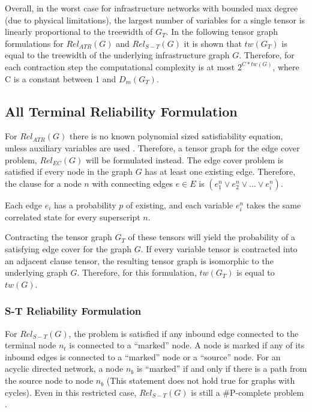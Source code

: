 \documentclass[12pt,twocolumn]{article}
\begin{document}
Overall, in the worst case for infrastructure networks with bounded max degree (due to physical limitations), the largest number of variables for a single tensor is linearly proportional to the treewidth of \(G_T\). In the following tensor graph formulations for \(Rel_{ATR}(G)\) and \(Rel_{S-T}(G)\) it is shown that \(tw(G_T)\) is equal to the treewidth of the underlying infrastructure graph \(G\). Therefore, for each contraction step the computational complexity is at most \(2^{C*tw(G)}\), where C is a constant between 1 and \(D_m(G_T)\).

\hypertarget{all-terminal-reliability-formulation}{%
\subsection{All Terminal Reliability Formulation}\label{all-terminal-reliability-formulation}}

For \(Rel_{ATR}(G)\) there is no known polynomial sized satisfiability equation, unless auxiliary variables are used \cite{paredes2019principled}. Therefore, a tensor graph for the edge cover problem, \(Rel_{EC}(G)\) will be formulated instead. The edge cover problem is satisfied if every node in the graph \(G\) has at least one existing edge. Therefore, the clause for a node \(n\) with connecting edges \(e \in E\) is \((e_1^n \lor e_2^n \lor ... \lor e_i^n)\).

Each edge \(e_i\) has a probability \(p\) of existing, and each variable \(e_i^n\) takes the same correlated state for every superscript \(n\).

Contracting the tensor graph \(G_T\) of these tensors will yield the probability of a satisfying edge cover for the graph \(G\). If every variable tensor is contracted into an adjacent clause tensor, the resulting tensor graph is isomorphic to the underlying graph \(G\). Therefore, for this formulation, \(tw(G_T)\) is equal to \(tw(G)\).

\hypertarget{s-t-reliability-formulation}{%
\subsubsection{S-T Reliability Formulation}\label{s-t-reliability-formulation}}

For \(Rel_{S-T}(G)\), the problem is satisfied if any inbound edge connected to the terminal node \(n_t\) is connected to a ``marked'' node. A node is marked if any of its inbound edges is connected to a ``marked'' node or a ``source'' node. For an acyclic directed network, a node \(n_b\) is ``marked'' if and only if there is a path from the source node to node \(n_b\) (This statement does not hold true for graphs with cycles). Even in this restricted case, \(Rel_{S-T}(G)\) is still a \#P-complete problem \cite{provan1986complexity}.
\end{document}
